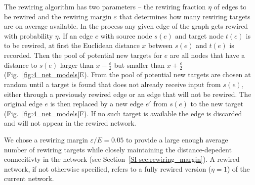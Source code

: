 The rewiring algorithm has two parameters -- the rewiring fraction
$\eta$ of edges to be rewired and the rewiring margin $\varepsilon$ that
determines how many rewiring targets are on average available. In the
process any given edge of the graph gets rewired with probability
$\eta$. If an edge $e$ with source node $s(e)$ and target node $t(e)$
is to be rewired, at first the Euclidean distance $x$ between $s(e)$
and $t(e)$ is recorded. Then the pool of potential new targets for $e$
are all nodes that have a distance to $s(e)$ larger than
$x-\frac{\varepsilon}{2}$ but smaller than $x+\frac{\varepsilon}{2}$
(Fig.~\ref{fig:4_net_models}E). From the pool of potential new targets
are chosen at random until a target is found that does not already
receive input from $s(e)$, either through a previously rewired edge or
an edge that will not be rewired. The original edge $e$ is then
replaced by a new edge $e'$ from $s(e)$ to the new target
(Fig.~\ref{fig:4_net_models}F). If no such target is available the
edge is discarded and will not appear in the rewired network.

We chose a rewiring margin $\varepsilon / E = 0.05$ to provide a large
enough average number of rewiring targets while closely maintaining
the distance-depedent connecitivty in the network (see
Section~\ref{SI-sec:rewiring_margin}). A rewired network, if not
otherwise specified, refers to a fully rewired version ($\eta=1$) of
the current network. 












